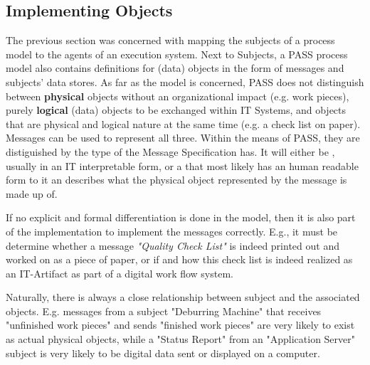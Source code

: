 \subsection{Implementing Objects}

The previous section was concerned with mapping the subjects of a process model to the agents of an execution system. Next to Subjects, a PASS process model also contains definitions for (data) objects in the form of messages and subjects' data stores. As far as the model is concerned, PASS does not distinguish between \textbf{physical} objects without an organizational impact (e.g. work pieces), purely \textbf{logical} (data) objects  to be exchanged within IT Systems, and objects that are physical and logical nature at the same time (e.g. a check list on paper). Messages can be used to represent all three. Within the means of PASS, they are distiguished by the type of  the Message Specification has. It will either be , usually in an IT interpretable form, or a  that most likely has an human readable form to it an describes what the physical object represented by the message is made up of. 

If no explicit and formal differentiation is done in the model, then it is also part of the implementation to implement the messages correctly. E.g., it must be determine whether a message \textit{"Quality Check List"} is indeed printed out and worked on as a piece of paper, or if and how this check list is indeed realized as an IT-Artifact as part of a digital work flow system. 

Naturally, there is always a close relationship between subject and the associated objects. E.g. messages from a subject "Deburring Machine" that receives "unfinished work pieces" and sends "finished work pieces" are very likely to exist as actual physical objects, while a "Status Report" from an "Application Server" subject is very likely to be digital data sent or displayed on a computer. 




